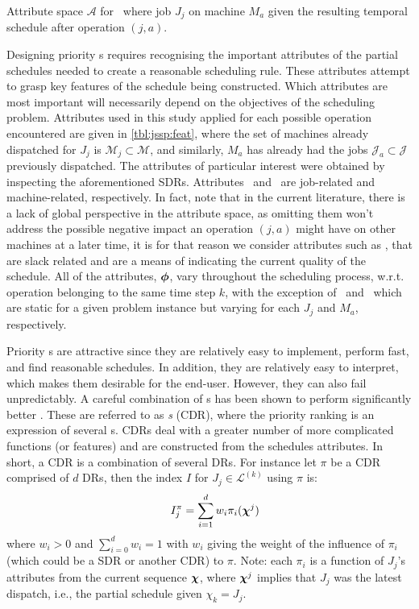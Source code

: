 \documentclass[twocolumn]{svjour3}
\begin{document}
\begin{table}[t!] \centering
\caption[Attribute space $\mathcal{A}$ for \JSP]{Attribute space 
$\mathcal{A}$ for \JSP\ where job $J_j$ on machine $M_a$ given the 
resulting temporal schedule after operation $(j,a)$.
}
\label{tbl:jssp:feat}
{\setlength{\tabcolsep}{3pt} }
\end{table}

Designing priority \dr s requires recognising the important 
attributes of the partial schedules needed to create a reasonable scheduling 
rule. 
These attributes attempt to grasp key features of the schedule being 
constructed. Which attributes are most important will necessarily depend on the
objectives of the scheduling problem. 
Attributes used in this study applied for each possible operation encountered 
are given in \cref{tbl:jssp:feat}, where the set of machines already dispatched 
for $J_j$ is $\mathcal{M}_j\subset\mathcal{M}$, and similarly, $M_a$ has 
already had the jobs $\mathcal{J}_a\subset\mathcal{J}$ previously dispatched.
The attributes of particular interest were obtained by inspecting the 
aforementioned SDRs. Attributes \phiJobRelated\ and \phiMacRelated\ are 
job-related and machine-related, respectively.
In fact, \cite{Pickardt2013} note that in the current literature, there is a 
lack of global perspective in the attribute space, as omitting them won't 
address the possible negative impact an operation $(j,a)$ might have on other 
machines at a later time, it is for that reason we consider attributes such as 
\phiSlackRelated, that are slack related and are a means of indicating the 
current quality of the schedule.
All of the attributes, $\bm{\phi}$, vary throughout the scheduling process, 
w.r.t. operation belonging to the same time step $k$, with the exception of 
\phijobTotProcTime\ and \phimacTotProcTime\ which are static for a given 
problem instance but varying for each $J_j$ and $M_a$, respectively. 

Priority \dr s are attractive since they are relatively easy to 
implement, perform fast, and find reasonable schedules. In addition, they are 
relatively 
easy to interpret, which makes them desirable for the end-user.
However, they can also fail unpredictably. 
A careful combination of \dr s has been shown to perform significantly better 
\cite{Jayamohan04}. These are referred to as \emph{\cdr s} 
(CDR), where the priority ranking is an expression of several \dr s. 
CDRs deal with a greater number of more complicated functions (or features) and 
are
constructed from the schedules attributes. In short, a CDR is a combination of 
several DRs. 
For instance let $\pi$ be a CDR comprised of $d$ DRs, then the index $I$ for 
$J_j\in\mathcal{L}^{(k)}$ using $\pi$ is:
\begin{equation}\quad I_j^{\pi} = \sum_{i=1}^d w_i \pi_i(\bm \chi^j) 
\label{eq:CDR}
\end{equation}
where $w_i>0$ and $\sum_{i=0}^d w_i = 1$ with $w_i$ giving the weight of the 
influence of $\pi_i$ (which could be a SDR or another CDR) to $\pi$. Note: 
each $\pi_i$ is a function of $J_j$'s attributes from the current sequence 
$\bm \chi$, where $\bm \chi^j$ implies that $J_j$ was the latest dispatch, i.e., the 
partial schedule given $\chi_k=J_j$.
\end{document}
